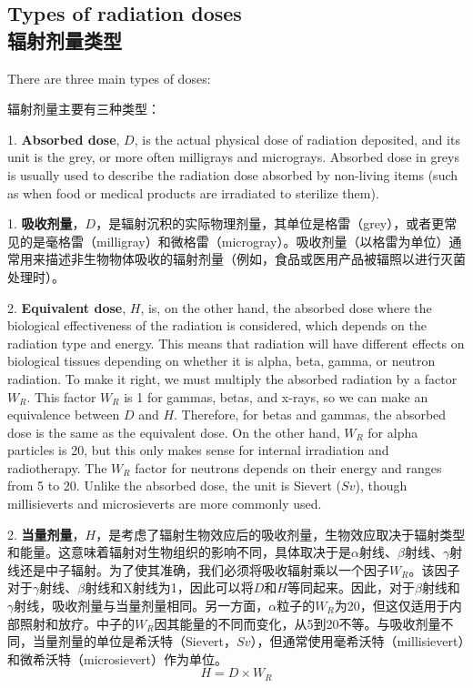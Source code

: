 \documentclass[dvipsnames, svgnames,a4paper,11pt]{article}
\begin{document}
\subsection{Types of radiation doses \\辐射剂量类型}

There are three main types of doses:

辐射剂量主要有三种类型：

1. \textbf{Absorbed dose}, \(D\), is the actual physical dose of radiation deposited, and its unit is the grey, or more often milligrays and micrograys. Absorbed dose in greys is usually used to describe the radiation dose absorbed by non-living items (such as when food or medical products are irradiated to sterilize them).

1. \textbf{吸收剂量}，\(D\)，是辐射沉积的实际物理剂量，其单位是格雷（grey），或者更常见的是毫格雷（milligray）和微格雷（microgray）。吸收剂量（以格雷为单位）通常用来描述非生物物体吸收的辐射剂量（例如，食品或医用产品被辐照以进行灭菌处理时）。

2. \textbf{Equivalent dose}, \(H\), is, on the other hand, the absorbed dose where the biological effectiveness of the radiation is considered, which depends on the radiation type and energy. This means that radiation will have different effects on biological tissues depending on whether it is alpha, beta, gamma, or neutron radiation. To make it right, we must multiply the absorbed radiation by a factor \(W_R\). This factor \(W_R\) is 1 for gammas, betas, and x-rays, so we can make an equivalence between \(D\) and \(H\). Therefore, for betas and gammas, the absorbed dose is the same as the equivalent dose. On the other hand, \(W_R\) for alpha particles is 20, but this only makes sense for internal irradiation and radiotherapy. The \(W_R\) factor for neutrons depends on their energy and ranges from 5 to 20. Unlike the absorbed dose, the unit is Sievert (\(Sv\)), though millisieverts and microsieverts are more commonly used.

2. \textbf{当量剂量}，\(H\)，是考虑了辐射生物效应后的吸收剂量，生物效应取决于辐射类型和能量。这意味着辐射对生物组织的影响不同，具体取决于是$\alpha$射线、$\beta$射线、$\gamma$射线还是中子辐射。为了使其准确，我们必须将吸收辐射乘以一个因子\(W_R\)。该因子对于$\gamma$射线、$\beta$射线和X射线为1，因此可以将\(D\)和\(H\)等同起来。因此，对于$\beta$射线和$\gamma$射线，吸收剂量与当量剂量相同。另一方面，$\alpha$粒子的\(W_R\)为20，但这仅适用于内部照射和放疗。中子的\(W_R\)因其能量的不同而变化，从5到20不等。与吸收剂量不同，当量剂量的单位是希沃特（Sievert，\(Sv\)），但通常使用毫希沃特（millisievert）和微希沃特（microsievert）作为单位。
$$H=D \times W_R$$
\end{document}
